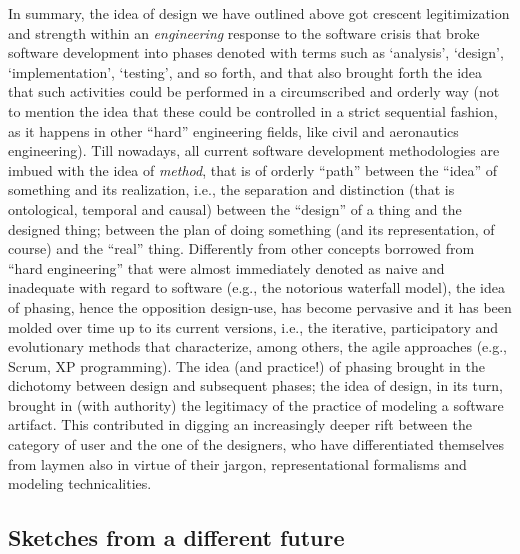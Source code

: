 \documentclass{article}
\begin{document}
In summary, the idea of design we have outlined above got crescent legitimization and strength within an \emph{engineering} response to the software crisis that broke software development into phases denoted with terms such as `analysis', `design',
`implementation', `testing', and so forth, and that also brought forth the idea that such activities could be performed in a circumscribed and orderly way (not to mention the idea that these could be controlled in a strict sequential fashion, as it happens in other ``hard'' engineering fields, like civil and aeronautics engineering).
Till nowadays, all current software development methodologies are imbued with the idea of \emph{method}, that is of orderly ``path'' between the ``idea'' of something and its realization, i.e., the separation and distinction (that is ontological, temporal and causal) between the ``design'' of a thing and the designed thing; between the plan of doing something (and its representation, of course) and the ``real'' thing. Differently from other concepts borrowed from ``hard engineering'' that were almost immediately denoted as naive and inadequate with regard to software (e.g., the notorious waterfall model), the idea of phasing, hence the opposition design-use, has become pervasive and it has been molded over time up to its current versions, i.e., the iterative, participatory and evolutionary methods that characterize, among others, the agile approaches (e.g., Scrum, XP programming). The idea (and practice!) of phasing brought in the dichotomy between design and subsequent phases; the idea of design, in its turn, brought in (with authority) the legitimacy of the practice of modeling a software artifact. This contributed in digging an increasingly deeper rift between the category of user and the one of the designers, who have differentiated themselves from laymen also in virtue of their jargon, representational formalisms and modeling technicalities. 




\subsection{Sketches from a different future}
\label{subsec:story}
\end{document}
